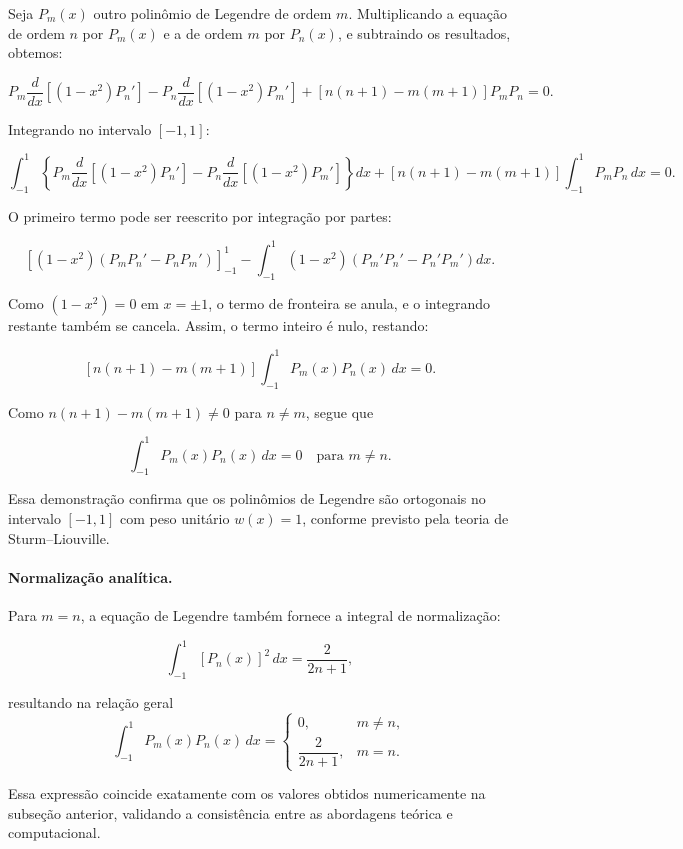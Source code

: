 \documentclass[12pt,a4paper]{article}
\begin{document}
Seja \(P_m(x)\) outro polinômio de Legendre de ordem \(m\).
Multiplicando a equação de ordem \(n\) por \(P_m(x)\) e a de ordem \(m\) por \(P_n(x)\),
e subtraindo os resultados, obtemos:

\[
P_m\frac{d}{dx}\!\left[(1-x^2)P_n'\right]
- P_n\frac{d}{dx}\!\left[(1-x^2)P_m'\right]
+ [n(n+1) - m(m+1)]P_mP_n = 0.
\]

Integrando no intervalo \([-1,1]\):

\[
\int_{-1}^{1} \left\{ P_m\frac{d}{dx}\!\left[(1-x^2)P_n'\right]
- P_n\frac{d}{dx}\!\left[(1-x^2)P_m'\right]\right\} dx
+ [n(n+1) - m(m+1)] \int_{-1}^{1} P_m P_n\,dx = 0.
\]

O primeiro termo pode ser reescrito por integração por partes:

\[
\left[ (1-x^2)\left(P_m P_n' - P_n P_m'\right) \right]_{-1}^{1}
- \int_{-1}^{1} (1-x^2)\left(P_m'P_n' - P_n'P_m'\right) dx.
\]

Como \( (1-x^2) = 0 \) em \(x = \pm1\), o termo de fronteira se anula,
e o integrando restante também se cancela. Assim, o termo inteiro é nulo,
restando:

\[
[n(n+1) - m(m+1)] \int_{-1}^{1} P_m(x)P_n(x)\,dx = 0.
\]

Como \(n(n+1) - m(m+1) \neq 0\) para \(n \ne m\), segue que

\[
\boxed{\displaystyle
\int_{-1}^{1} P_m(x)P_n(x)\,dx = 0 \quad \text{para } m \ne n.}
\]

Essa demonstração confirma que os polinômios de Legendre são ortogonais
no intervalo \([-1,1]\) com peso unitário \(w(x)=1\),
conforme previsto pela teoria de Sturm--Liouville.

\paragraph{Normalização analítica.}
Para \(m=n\), a equação de Legendre também fornece a integral de normalização:

\[
\int_{-1}^{1} [P_n(x)]^2\,dx = \frac{2}{2n+1},
\]

resultando na relação geral
\[
\boxed{
\int_{-1}^{1} P_m(x)P_n(x)\,dx =
\begin{cases}
0, & m \ne n,\\[4pt]
\dfrac{2}{2n+1}, & m = n.
\end{cases}
}
\]

Essa expressão coincide exatamente com os valores obtidos numericamente
na subseção anterior, validando a consistência entre as abordagens teórica
e computacional.
\end{document}
